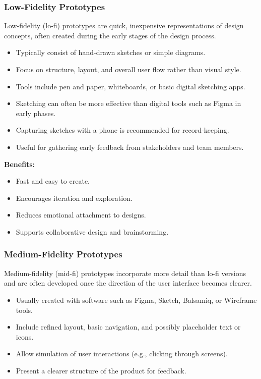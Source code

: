 \documentclass{article}
\begin{document}
\subsubsection{Low-Fidelity Prototypes}

Low-fidelity (lo-fi) prototypes are quick, inexpensive representations of design concepts, often created during the early stages of the design process.

\begin{itemize}
    \item Typically consist of hand-drawn sketches or simple diagrams.
    \item Focus on structure, layout, and overall user flow rather than visual style.
    \item Tools include pen and paper, whiteboards, or basic digital sketching apps.
    \item Sketching can often be more effective than digital tools such as Figma in early phases.
    \item Capturing sketches with a phone is recommended for record-keeping.
    \item Useful for gathering early feedback from stakeholders and team members.
\end{itemize}

\textbf{Benefits:}
\begin{itemize}
    \item Fast and easy to create.
    \item Encourages iteration and exploration.
    \item Reduces emotional attachment to designs.
    \item Supports collaborative design and brainstorming.
\end{itemize}

\subsubsection{Medium-Fidelity Prototypes}

Medium-fidelity (mid-fi) prototypes incorporate more detail than lo-fi versions and are often developed once the direction of the user interface becomes clearer.

\begin{itemize}
    \item Usually created with software such as Figma, Sketch, Balsamiq, or Wireframe tools.
    \item Include refined layout, basic navigation, and possibly placeholder text or icons.
    \item Allow simulation of user interactions (e.g., clicking through screens).
    \item Present a clearer structure of the product for feedback.
\end{itemize}
\end{document}
